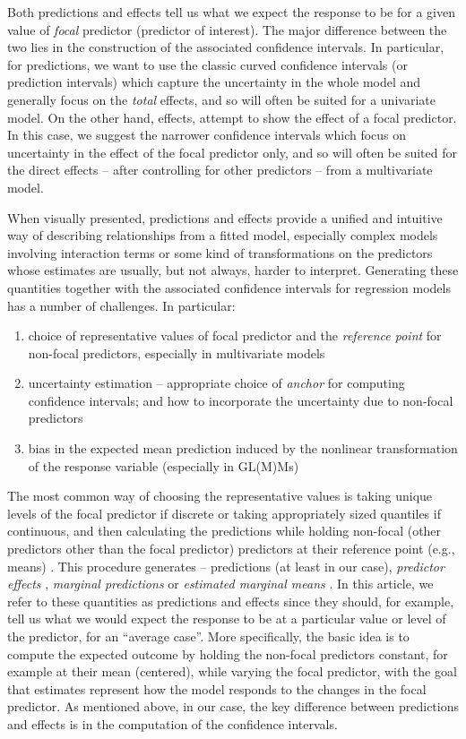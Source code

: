 Both predictions and effects tell us what we expect the response to be for a given value of \emph{focal} predictor (predictor of interest). The major difference between the two lies in the construction of the associated confidence intervals. In particular, for predictions, we want to use the classic curved confidence intervals (or prediction intervals) which capture the uncertainty in the whole model and generally focus on the \emph{total} effects, and so will often be suited for a univariate model. On the other hand, effects, attempt to show the effect of a focal predictor. In this case, we suggest the narrower confidence intervals which focus on uncertainty in the effect of the focal predictor only, and so will often be suited for the direct effects – after controlling for other predictors – from a multivariate model.



When visually presented, predictions and effects provide a unified and intuitive way of describing relationships from a fitted model, especially complex models involving interaction terms or some kind of transformations on the predictors whose estimates are usually, but not always, harder to interpret. Generating these quantities together with the associated confidence intervals for regression models has a number of challenges. In particular:
\begin{enumerate}
\item choice of representative values of focal predictor and the \emph{reference point} for non-focal predictors, especially in multivariate models
\item  uncertainty estimation -- appropriate choice of \emph{anchor} for computing confidence intervals; and how to incorporate the uncertainty due to non-focal predictors 
\item bias in the expected mean prediction induced by the nonlinear transformation of the response variable (especially in GL(M)Ms)
\end{enumerate}

The most common way of choosing the representative values is taking unique levels of the focal predictor if discrete or taking appropriately sized quantiles if continuous, and then calculating the predictions while holding non-focal (other predictors other than the focal predictor) predictors at their reference point (e.g., means) \citep{fox2009effect, hanmer2013behind}. This procedure generates -- predictions (at least in our case), \emph{predictor effects} \citep{fox2009effect}, \emph{marginal predictions} \citep{leeper2017package} or \emph{estimated marginal means} \citep{lenth2018package}. In this article, we refer to these quantities as predictions and effects since they should, for example, tell us what we would expect the response to be at a particular value or level of the predictor, for an ``average case''. More specifically, the basic idea is to compute the expected outcome by holding the non-focal predictors constant, for example at their mean (centered), while varying the focal predictor, with the goal that estimates represent how the model responds to the changes in the focal predictor. As mentioned above, in our case, the key difference between predictions and effects is in the computation of the confidence intervals.

